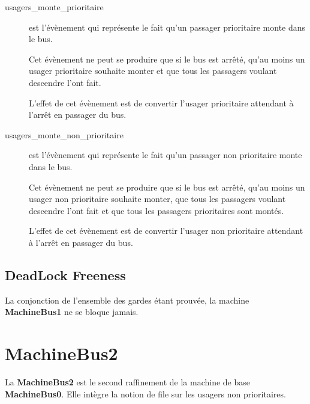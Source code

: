 \documentclass[a4paper,titlepage]{report}
\begin{document}
		\begin{description}
			\item[usagers\_monte\_prioritaire] est l'évènement qui représente le fait qu'un passager prioritaire monte dans le bus.
			
			Cet évènement ne peut se produire que si le bus est arrêté, qu'au moins un usager prioritaire souhaite monter et que tous les passagers voulant descendre l'ont fait.
			
			L'effet de cet évènement est de convertir l'usager prioritaire attendant à l'arrêt en passager du bus.\\
			
			\item[usagers\_monte\_non\_prioritaire] est l'évènement qui représente le fait qu'un passager non prioritaire monte dans le bus.
			
			Cet évènement ne peut se produire que si le bus est arrêté, qu'au moins un usager non prioritaire souhaite monter, que tous les passagers voulant descendre l'ont fait et que tous les passagers prioritaires sont montés.
			
			L'effet de cet évènement est de convertir l'usager non prioritaire attendant à l'arrêt en passager du bus.\\
		\end{description}

\subsection{DeadLock Freeness}
	La conjonction de l'ensemble des gardes étant prouvée, la machine \textbf{MachineBus1} ne se bloque jamais.
	
	
	
\section{MachineBus2}	
	La \textbf{MachineBus2} est le second raffinement de la machine de base \textbf{MachineBus0}. Elle intègre la notion de file sur les usagers non prioritaires.\\
	
	
	
		
\end{document}
